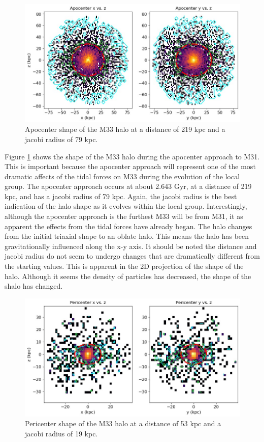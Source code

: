\documentclass[usenatbib]{mnras}
\begin{document}
\begin{figure}
	\includegraphics[width=\columnwidth]{apocenter_shape.jpeg}
    \caption{Apocenter shape of the M33 halo at a distance of 219 kpc and a jacobi radius of 79 kpc.}
    \label{fig:apocenter}
\end{figure}


Figure \ref{fig:apocenter} shows the shape of the M33 halo during the apocenter approach to M31. This is important because the apocenter approach will represent one of the most dramatic affects of the tidal forces on M33 during the evolution of the local group. The apocenter approach occurs at about 2.643 Gyr, at a distance of 219 kpc, and has a jacobi radius of 79 kpc. Again, the jacobi radius is the best indication of the halo shape as it evolves within the local group. Interestingly, although the apocenter approach is the furthest M33 will be from M31, it as apparent the effects from the tidal forces have already began. The halo changes from the initial triaxial shape to an oblate halo. This means the halo has been gravitationally influenced along the x-y axis. It should be noted the distance and jacobi radius do not seem to undergo changes that are dramatically different from the starting values. This is apparent in the 2D projection of the shape of the halo. Although it seems the density of particles has decreased, the shape of the shalo has changed.  

\begin{figure}
	\includegraphics[width=\columnwidth]{pericenter_shape.jpeg}
    \caption{Pericenter shape of the M33 halo at a distance of 53 kpc and a jacobi radius of 19 kpc.}
    \label{fig:pericenter}
\end{figure}
\end{document}
